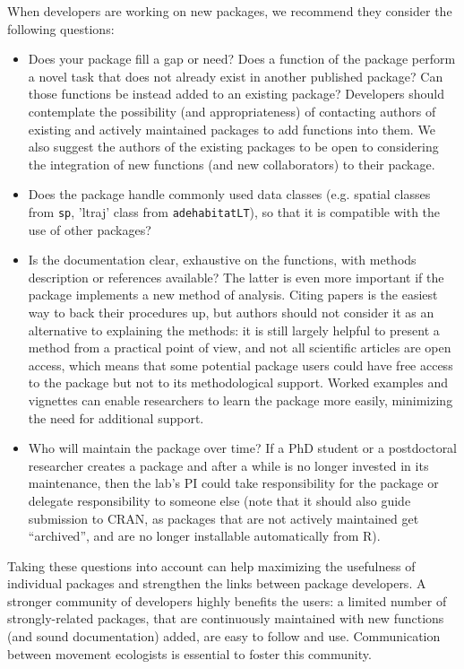 \documentclass[a4paper,12pt]{article}
\newcommand{\Rpkg}[1]{\texttt{#1}}
\begin{document}
When developers are working on new packages, we recommend they consider the following questions:
\begin{itemize}
        \item Does your package fill a gap or need? Does a function of the package perform a novel task that does not already exist in another published package? Can those functions be instead added to an existing package? Developers should contemplate the possibility (and appropriateness) of contacting authors of existing and actively maintained packages to add functions into them. We also suggest the authors of the existing packages to be open to considering the integration of new functions (and new collaborators) to their package.
        \item Does the package handle commonly used data classes (e.g. spatial classes from \Rpkg{sp}, 'ltraj' class from \Rpkg{adehabitatLT}), so that it is compatible with the use of other packages? %
        \item Is the documentation clear, exhaustive on the functions, with methods description or references available? The latter is even more important if the package implements a new method of analysis. Citing papers is the easiest way to back their procedures up, but authors should not consider it as an alternative to explaining the methods: it is still largely helpful to present a method from a practical point of view, and not all scientific articles are open access, which means that some potential package users could have free access to the package but not to its methodological support. Worked %
examples and vignettes can enable researchers to learn the package more easily, minimizing the need for additional support.
        \item Who will maintain the package over time? If a PhD student or a postdoctoral researcher creates a package and after a while is no longer invested in its maintenance, then the lab's PI could take responsibility for the package or delegate responsibility to someone else (note that it should also guide submission to CRAN, as packages that are not actively maintained get ``archived'', and are no longer installable automatically from R).
\end{itemize} 

Taking these questions into account can help maximizing the usefulness of individual packages and strengthen the links between package developers. A stronger community of developers  highly benefits the users: a limited number of strongly-related packages, that are continuously maintained with new functions (and sound documentation) added, are easy to follow and use. Communication between movement ecologists is essential to foster this community. 
\end{document}
